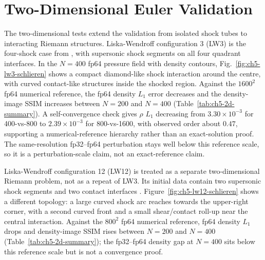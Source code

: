 \section{Two-Dimensional Euler Validation}
The two-dimensional tests extend the validation from isolated shock tubes to
interacting Riemann structures. Liska-Wendroff configuration 3 (LW3) is the
four-shock case from \citet{liska_wendroff_2003}, with supersonic shock
segments on all four quadrant interfaces. In the $N=400$ fp64 pressure field with density contours,
Fig.~\ref{fig:ch5-lw3-schlieren} shows a compact diamond-like shock interaction
around the centre, with curved contact-like structures inside the shocked
region. Against the $1600^2$ fp64 numerical reference, the fp64 density $L_1$ error decreases and the density-image SSIM increases between $N=200$ and $N=400$
(Table~\ref{tab:ch5-2d-summary}). A self-convergence check gives $\rho$ $L_1$
decreasing from $3.30{\times}10^{-3}$ for 400-vs-800 to
$2.39{\times}10^{-3}$ for 800-vs-1600, with observed order about $0.47$,
supporting a numerical-reference hierarchy rather than an exact-solution proof.
The same-resolution fp32--fp64 perturbation stays well below this reference
scale, so it is a perturbation-scale claim, not an exact-reference claim.

Liska-Wendroff configuration 12 (LW12) is treated as a separate
two-dimensional Riemann problem, not as a repeat of LW3. Its initial data
contain two supersonic shock segments and two contact interfaces
\citep{liska_wendroff_2003}. Figure~\ref{fig:ch5-lw12-schlieren} shows a
different topology: a large curved shock arc reaches towards the upper-right
corner, with a second curved front and a small shear/contact roll-up near the
central interaction. Against the $800^2$ fp64 numerical reference, fp64 density $L_1$ drops and density-image SSIM rises between $N=200$ and $N=400$ (Table~\ref{tab:ch5-2d-summary}); the fp32--fp64 density gap at $N=400$ sits below this reference scale but is not a convergence proof.

